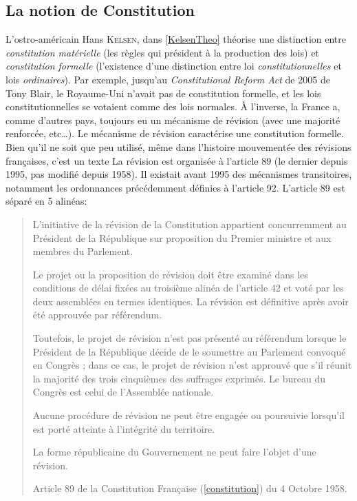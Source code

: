 \documentclass[math]{cours}
\begin{document}
\subsection{La notion de Constitution}
L'ostro-américain Hans \textsc{Kelsen}, dans \ref{KelsenTheo} théorise une distinction entre \emph{constitution matérielle} (les règles qui président à la production des lois) et \emph{constitution formelle} (l'existence d'une distinction entre loi \emph{constitutionnelles} et lois \emph{ordinaires}).
Par exemple, jusqu'au \emph{Constitutional Reform Act} de 2005 de Tony Blair, le Royaume-Uni n'avait pas de constitution formelle, et les lois constitutionnelles se votaient comme des lois normales.
À l'inverse, la France a, comme d'autres pays, toujours eu un mécanisme de révision (avec une majorité renforcée, etc\ldots).
Le mécanisme de révision caractérise une constitution formelle.
Bien qu'il ne soit que peu utilisé, même dans l'histoire mouvementée des révisions françaises, c'est un texte
La révision est organisée à l'article 89 (le dernier depuis 1995, pas modifié depuis 1958). Il existait avant 1995 des mécanismes transitoires, notamment les ordonnances précédemment définies à l'article 92.
L'article 89 est séparé en 5 alinéas:
\begin{quote}
	L'initiative de la révision de la Constitution appartient concurremment au Président de la République sur proposition du Premier ministre et aux membres du Parlement.

Le projet ou la proposition de révision doit être examiné dans les conditions de délai fixées au troisième alinéa de l'article 42 et voté par les deux assemblées en termes identiques. La révision est définitive après avoir été approuvée par référendum.

Toutefois, le projet de révision n'est pas présenté au référendum lorsque le Président de la République décide de le soumettre au Parlement convoqué en Congrès ; dans ce cas, le projet de révision n'est approuvé que s'il réunit la majorité des trois cinquièmes des suffrages exprimés. Le bureau du Congrès est celui de l'Assemblée nationale.

Aucune procédure de révision ne peut être engagée ou poursuivie lorsqu'il est porté atteinte à l'intégrité du territoire.

La forme républicaine du Gouvernement ne peut faire l'objet d'une révision.
\begin{center}
	Article 89 de la Constitution Française (\ref{constitution}) du 4 Octobre 1958.
\end{center}
\end{quote}
\end{document}
